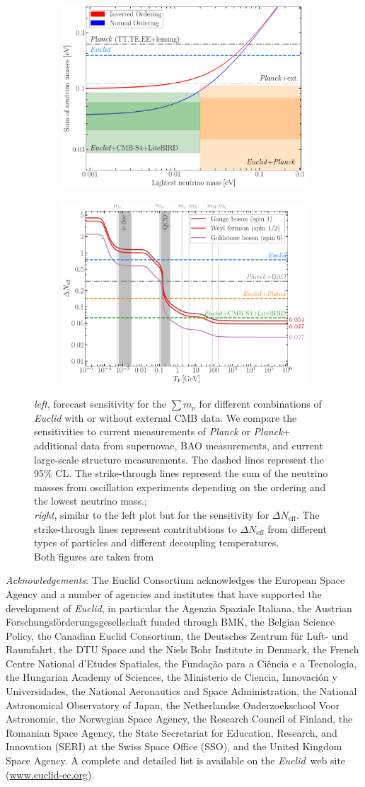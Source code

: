\documentclass[a4paper,11pt]{article}
\newcommand{\euclid}{\textit{Euclid}\xspace}
\newcommand{\planck}{\textit{Planck}\xspace}
\newcommand{\dneff}{\Delta N_\mathrm{eff}}
\newcommand{\summnu}{\sum m_\nu}
\newcommand*{\AckInstitutions}{a number of agencies and
  institutes that have supported the development of \euclid, in
  particular
  the Agenzia Spaziale Italiana,
  the Austrian Forschungsf\"orderungsgesellschaft funded through BMK,
  the Belgian Science Policy,
  the Canadian Euclid Consortium,
  the Deutsches Zentrum f\"ur Luft- und Raumfahrt,
  the DTU Space and the Niels Bohr Institute in Denmark,
  the French Centre National d'Etudes Spatiales,
  the Funda\c{c}\~{a}o para a Ci\^{e}ncia e a Tecnologia,
  the Hungarian Academy of Sciences,
  the Ministerio de Ciencia, Innovaci\'{o}n y Universidades,
  the National Aeronautics and Space Administration,
  the National Astronomical Observatory of Japan,
  the Netherlandse Onderzoekschool Voor Astronomie,
  the Norwegian Space Agency,
  the Research Council of Finland,
  the Romanian Space Agency,
  the State Secretariat for Education, Research, and Innovation (SERI) at the Swiss
  Space Office (SSO),
  and the United Kingdom Space Agency.
  A complete and detailed list is available on the \euclid\ web site
  (\url{www.euclid-ec.org}).\xspace}
\newcommand{\AckEC}{The Euclid Consortium acknowledges the European
  Space Agency and \AckInstitutions}
\begin{document}
\begin{figure}[!htbp]
    \centering
    \begin{subfigure}{0.49\textwidth}
        \centering
        \includegraphics[width=\linewidth]{figure_hierarchy-1.pdf}
    \end{subfigure}
    \hfill
    \begin{subfigure}{0.49\textwidth}
        \centering
        \includegraphics[width=\linewidth]{figure_Neff-1.pdf}
    \end{subfigure}
    \caption{\textit{left}, forecast sensitivity for the $\summnu$ for different combinations of \euclid with or without external CMB data. We compare the sensitivities to current measurements of \planck or \planck + additional data from supernovae, BAO measurements, and current large-scale structure measurements. The dashed lines represent the 95\% CL. The strike-through lines represent the sum of the neutrino masses from oscillation experiments depending on the ordering and the lowest neutrino mass.;\\
    \textit{right}, similar to the left plot but for the sensitivity for $\dneff$. The strike-through lines represent contritubtions to $\dneff$ from different types of particles and different decoupling temperatures.\\
    Both figures are taken from \cite{EP-Archidiacono}
    }
    \label{fig:results}
\end{figure}
\clearpage
\textit{Acknowledgements}: \AckEC



\end{document}
